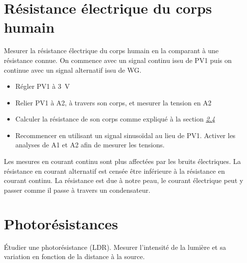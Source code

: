 \documentclass[a4paper,12pt,french]{sphinxmanual}
\let\sphinxpxdimen\pdfpxdimen\else\newdimen\sphinxpxdimen
\begin{document}
\section{Résistance électrique du corps humain}
\label{\detokenize{2.9:resistance-electrique-du-corps-humain}}\label{\detokenize{2.9::doc}}

Mesurer la résistance électrique du corps humain en la comparant à une
résistance connue. On commence avec un signal continu issu de PV1 puis
on continue avec un signal alternatif issu de WG.

\noindent\sphinxincludegraphics[width=300\sphinxpxdimen]{{res-body}.pdf}

\begin{itemize}
\item {} 
Régler PV1 à 3 V

\item {} 
Relier PV1 à A2, à travers son corps, et mesurer la tension en A2

\item {} 
Calculer la résistance de son corps comme expliqué à la section
{\hyperref[\detokenize{2.9:sec:Measure-resistance-by-comparison}]{\emph{2.4}}}

\item {} 
Recommencer en utilisant un signal sinusoïdal au lieu de PV1. Activer
les analyses de A1 et A2 afin de mesurer les tensions.

\end{itemize}


Les mesures en courant continu sont plus affectées par les bruits
électriques. La résistance en courant alternatif est censée être
inférieure à la résistance en courant continu. La résistance est due à
notre peau, le courant électrique peut y passer comme il passe à travers
un condensateur.


\section{Photorésistances}
\label{\detokenize{2.10:photoresistances}}\label{\detokenize{2.10::doc}}

Étudier une photorésistance (LDR). Mesurer l’intensité de la lumière et
sa variation en fonction de la distance à la source.

\noindent\sphinxincludegraphics[width=300\sphinxpxdimen]{{ldr}.pdf}
\end{document}

